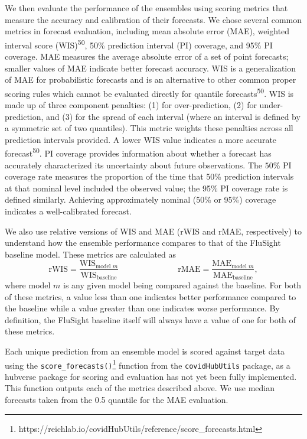 \documentclass[
  letterpaper,
  DIV=11,
  numbers=noendperiod]{scrartcl}
\begin{document}
We then evaluate the performance of the ensembles using scoring metrics
that measure the accuracy and calibration of their forecasts. We chose
several common metrics in forecast evaluation, including mean absolute
error (MAE), weighted interval score (WIS)\textsuperscript{50}, 50\%
prediction interval (PI) coverage, and 95\% PI coverage. MAE measures
the average absolute error of a set of point forecasts; smaller values
of MAE indicate better forecast accuracy. WIS is a generalization of MAE
for probabilistic forecasts and is an alternative to other common proper
scoring rules which cannot be evaluated directly for quantile
forecasts\textsuperscript{50}. WIS is made up of three component
penalties: (1) for over-prediction, (2) for under-prediction, and (3)
for the spread of each interval (where an interval is defined by a
symmetric set of two quantiles). This metric weights these penalties
across all prediction intervals provided. A lower WIS value indicates a
more accurate forecast\textsuperscript{50}. PI coverage provides
information about whether a forecast has accurately characterized its
uncertainty about future observations. The \(50\)\% PI coverage rate
measures the proportion of the time that 50\% prediction intervals at
that nominal level included the observed value; the 95\% PI coverage
rate is defined similarly. Achieving approximately nominal (50\% or
95\%) coverage indicates a well-calibrated forecast.

We also use relative versions of WIS and MAE (rWIS and rMAE,
respectively) to understand how the ensemble performance compares to
that of the FluSight baseline model. These metrics are calculated as
\[\textrm{rWIS} = \frac{\textrm{WIS}_{\textrm{model }m}}{\textrm{WIS}_{\textrm{baseline}}} \hspace{3cm} \textrm{rMAE} = \frac{\textrm{MAE}_{\textrm{model }m}}{\textrm{MAE}_{\textrm{baseline}}},\]
where model \(m\) is any given model being compared against the
baseline. For both of these metrics, a value less than one indicates
better performance compared to the baseline while a value greater than
one indicates worse performance. By definition, the FluSight baseline
itself will always have a value of one for both of these metrics.

Each unique prediction from an ensemble model is scored against target
data using the \texttt{score\_forecasts()}\footnote{https://reichlab.io/covidHubUtils/reference/score\_forecasts.html}
function from the \texttt{covidHubUtils} package, as a hubverse package
for scoring and evaluation has not yet been fully implemented. This
function outputs each of the metrics described above. We use median
forecasts taken from the 0.5 quantile for the MAE evaluation.
\end{document}
